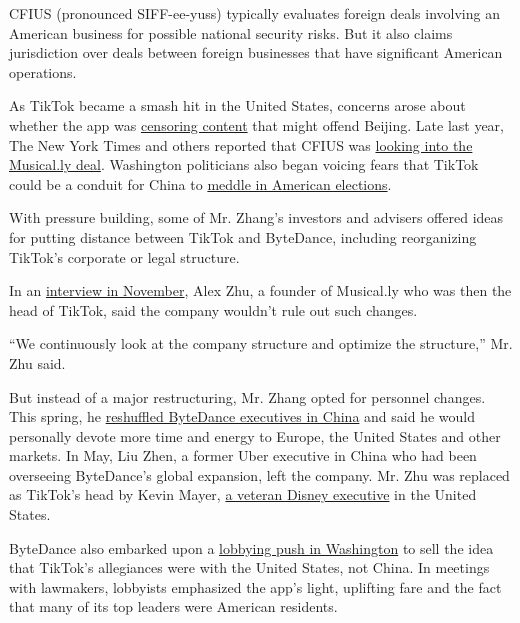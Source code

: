CFIUS (pronounced SIFF-ee-yuss) typically evaluates foreign deals
involving an American business for possible national security risks. But
it also claims jurisdiction over deals between foreign businesses that
have significant American operations.

As TikTok became a smash hit in the United States, concerns arose about
whether the app was
\href{https://www.theguardian.com/technology/2019/sep/25/revealed-how-tiktok-censors-videos-that-do-not-please-beijing}{censoring
content} that might offend Beijing. Late last year, The New York Times
and others reported that CFIUS was
\href{https://www.nytimes.com/2019/11/01/technology/tiktok-national-security-review.html}{looking
into the Musical.ly deal}. Washington politicians also began voicing
fears that TikTok could be a conduit for China to
\href{https://thehill.com/policy/technology/467280-schumer-cotton-request-tiktok-security-assessment}{meddle
in American elections}.

With pressure building, some of Mr. Zhang's investors and advisers
offered ideas for putting distance between TikTok and ByteDance,
including reorganizing TikTok's corporate or legal structure.

In an
\href{https://www.nytimes.com/2019/11/18/technology/tiktok-alex-zhu-interview.html}{interview
in November}, Alex Zhu, a founder of Musical.ly who was then the head of
TikTok, said the company wouldn't rule out such changes.

``We continuously look at the company structure and optimize the
structure,'' Mr. Zhu said.

But instead of a major restructuring, Mr. Zhang opted for personnel
changes. This spring, he
\href{https://mp.weixin.qq.com/s/OWrC9iXHxgUZtaLm8GN4ow}{reshuffled
ByteDance executives in China} and said he would personally devote more
time and energy to Europe, the United States and other markets. In May,
Liu Zhen, a former Uber executive in China who had been overseeing
ByteDance's global expansion, left the company. Mr. Zhu was replaced as
TikTok's head by Kevin Mayer,
\href{https://www.nytimes.com/2020/05/18/business/media/tiktok-ceo-kevin-mayer.html}{a
veteran Disney executive} in the United States.

ByteDance also embarked upon a
\href{https://www.nytimes.com/2020/07/15/technology/tiktok-washington-lobbyist.html}{lobbying
push in Washington} to sell the idea that TikTok's allegiances were with
the United States, not China. In meetings with lawmakers, lobbyists
emphasized the app's light, uplifting fare and the fact that many of its
top leaders were American residents.


